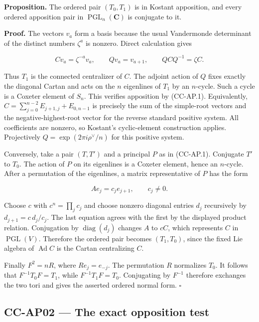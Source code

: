 \textbf{Proposition.} The ordered pair \((T_0,T_1)\) is in Kostant
apposition, and every ordered apposition pair in
\(\operatorname{PGL}_n(\mathbf C)\) is conjugate to it.

\textbf{Proof.} The vectors \(v_a\) form a basis because the usual
Vandermonde determinant of the distinct numbers \(\zeta^a\) is nonzero.
Direct calculation gives

\[
 Cv_a=\zeta^{-a}v_a,\qquad Qv_a=v_{a+1},
 \qquad QCQ^{-1}=\zeta C.
\]

Thus \(T_1\) is the connected centralizer of \(C\). The adjoint action
of \(Q\) fixes exactly the diagonal Cartan and acts on the \(n\)
eigenlines of \(T_1\) by an \(n\)-cycle. Such a cycle is a Coxeter
element of \(S_n\). This verifies apposition by (CC-AP.1). Equivalently,
\(C=\sum_{j=0}^{n-2}E_{j+1,j}+E_{0,n-1}\) is precisely the sum of the
simple-root vectors and the negative-highest-root vector for the reverse
standard positive system. All coefficients are nonzero, so Kostant's
cyclic-element construction applies. Projectively
\(Q=\exp(2\pi i\rho^\vee/n)\) for this positive system.

Conversely, take a pair \((T,T')\) and a principal \(P\) as in
(CC-AP.1). Conjugate \(T'\) to \(T_0\). The action of \(P\) on its
eigenlines is a Coxeter element, hence an \(n\)-cycle. After a
permutation of the eigenlines, a matrix representative of \(P\) has the
form

\[
 A e_j=c_j e_{j+1},\qquad c_j\ne0.
\]

Choose \(c\) with \(c^n=\prod_jc_j\) and choose nonzero diagonal entries
\(d_j\) recursively by \(d_{j+1}=c\,d_j/c_j\). The last equation agrees
with the first by the displayed product relation. Conjugation by
\(\operatorname{diag}(d_j)\) changes \(A\) to \(cC\), which represents
\(C\) in \(\operatorname{PGL}(V)\). Therefore the ordered pair becomes
\((T_1,T_0)\), since the fixed Lie algebra of \(\operatorname{Ad}C\) is
the Cartan centralizing \(C\).

Finally \(F^2=nR\), where \(Re_j=e_{-j}\). The permutation \(R\)
normalizes \(T_0\). It follows that \(F^{-1}T_0F=T_1\), while
\(F^{-1}T_1F=T_0\). Conjugating by \(F^{-1}\) therefore exchanges the
two tori and gives the asserted ordered normal form. \(\square\)

\subsection{CC-AP02 --- The exact opposition
test}\label{cc-ap02-the-exact-opposition-test}

